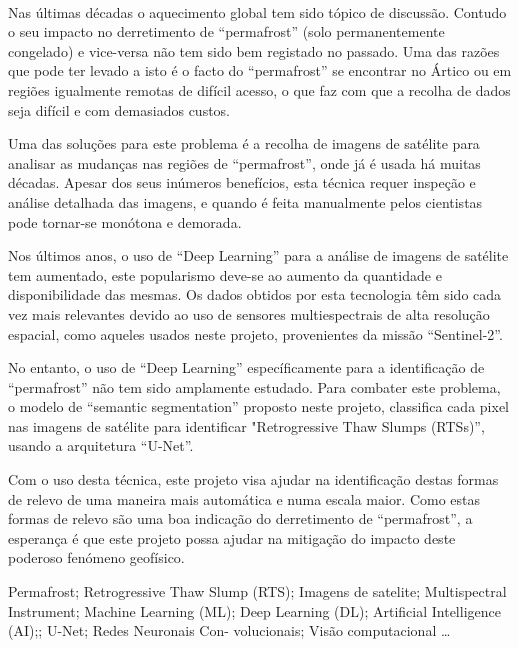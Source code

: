 
\paragraph{}
Nas últimas décadas o aquecimento global tem sido tópico de discussão. Contudo o seu impacto no derretimento de “permafrost” (solo permanentemente congelado) e vice-versa não tem sido bem registado no passado. Uma das razões que pode ter levado a isto é o facto do “permafrost” se encontrar no Ártico ou em regiões igualmente remotas de difícil acesso, o que faz com que a recolha de dados seja difícil e com demasiados custos.


Uma das soluções para este problema é a recolha de imagens de satélite para analisar as mudanças nas regiões de “permafrost”, onde já é usada há muitas décadas. Apesar dos seus inúmeros benefícios, esta técnica requer inspeção e análise detalhada das imagens, e quando é feita manualmente pelos cientistas pode tornar-se monótona e demorada.

Nos últimos anos, o uso de “Deep Learning” para a análise de imagens de satélite tem aumentado, este popularismo deve-se ao aumento da quantidade e disponibilidade das mesmas. Os dados obtidos por esta tecnologia têm sido cada vez mais relevantes devido ao uso de sensores multiespectrais de alta resolução espacial, como aqueles usados neste projeto, provenientes da missão “Sentinel-2”.


No entanto, o uso de “Deep Learning” específicamente para a identificação de “permafrost” não tem sido amplamente estudado. Para combater este problema, o modelo de “semantic segmentation” proposto neste projeto, classifica cada pixel nas imagens de satélite para identificar "Retrogressive Thaw Slumps (RTSs)”, usando a arquitetura “U-Net”.

Com o uso desta técnica, este projeto visa ajudar na identificação destas formas de relevo de uma maneira mais automática e numa escala maior. Como estas formas de relevo são uma boa indicação do derretimento de “permafrost”, a esperança é que este projeto possa ajudar na mitigação do impacto deste poderoso fenómeno geofísico.

\begin{keywords}
  Permafrost; Retrogressive Thaw Slump (RTS); Imagens de satelite;  Multispectral Instrument; Machine Learning (ML); Deep Learning (DL); Artificial Intelligence (AI);; U-Net; Redes Neuronais Con-
  volucionais; Visão computacional \ldots
\end{keywords}

